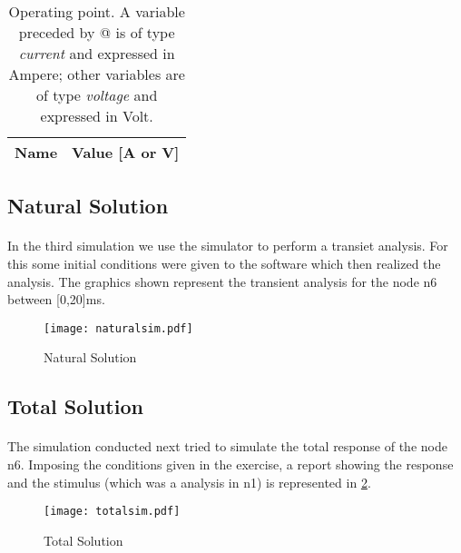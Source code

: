 \begin{table}[H]
  \centering
  \begin{tabular}{|c|c|}
    \hline    
    {\bf Name} & {\bf Value [A or V]} \\ \hline
    
  \end{tabular}
  \caption{Operating point. A variable preceded by @ is of type {\em current}
    and expressed in Ampere; other variables are of type {\it voltage} and expressed in
    Volt.}
  \label{sim2}
\end{table}

\newpage{}
\subsection{Natural Solution}
\paragraph{}

\par In the third simulation we use the simulator to perform a transiet analysis. For this some initial conditions were given to the software which then realized the analysis. The graphics shown represent the transient analysis for the node n6 between [0,20]ms.





\begin{figure}[H]
    \texttt{[image: naturalsim.pdf]}
    \centering
    \caption{Natural Solution}
    \label{mag}
\end{figure}



\subsection{Total Solution}
\paragraph{}

\par The simulation conducted next tried to simulate the total response of the node n6. Imposing the conditions given in the exercise, a report showing the response and the stimulus (which was a analysis in n1) is represented in \ref{total}.

\begin{figure}[H]
    \texttt{[image: totalsim.pdf]}
    \centering
    \caption{Total Solution}
    \label{total}
\end{figure}

